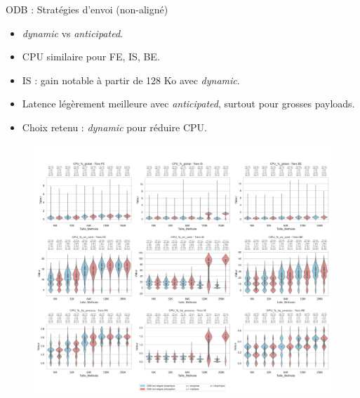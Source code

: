 \documentclass[aspectratio=43,8pt]{beamer}
\begin{document}
\begin{frame}{ODB : Stratégies d'envoi (non-aligné)}
\begin{itemize}
    \item \textit{dynamic} vs \textit{anticipated}.
    \item CPU similaire pour FE, IS, BE.
    \item IS : gain notable à partir de 128 Ko avec \textit{dynamic}.
    \item Latence légèrement meilleure avec \textit{anticipated}, surtout pour grosses payloads.
    \item Choix retenu : \textit{dynamic} pour réduire CPU.
\end{itemize}
\begin{figure}
    \includegraphics[width=\textwidth]{results/results-cmp/odb_unaligned_dynamic_vs_anticipated.png}
\end{figure}
\end{frame}
\end{document}
